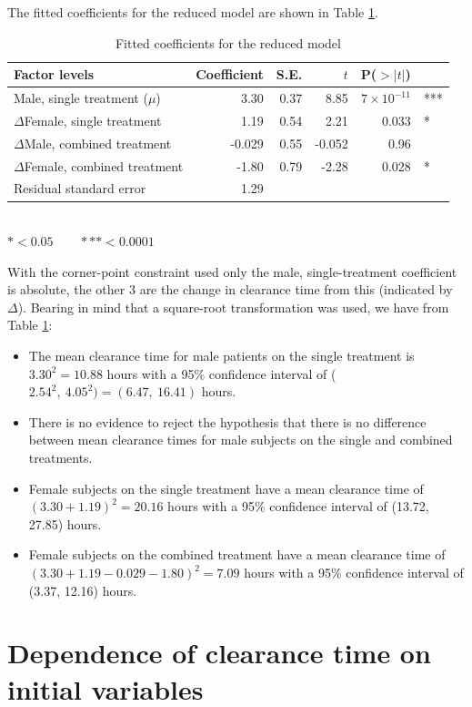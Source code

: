 The fitted coefficients for the reduced model are shown in Table \ref{coefreduced}.
\begin{table}[h]
\centering
\caption{Fitted coefficients for the reduced model}\label{coefreduced}
\begin{tabular}{l|rrrrl}
Factor levels&Coefficient&S.E.&$t$&P($>|t|$)\\
\hline
Male, single treatment ($\mu$)       &     3.30  &  0.37 &   8.85 &  $7\times 10^{-11}$& ***\\
$\Delta$Female, single treatment  &            1.19 &  0.54 &  2.21 &  0.033& *\\
$\Delta$Male, combined treatment    &    -0.029   & 0.55 & -0.052 &  0.96&\\
$\Delta$Female, combined treatment    &  -1.80   & 0.79  & -2.28  & 0.028& *\\
\hline
Residual standard error&1.29&&&
\end{tabular}\\
$*<0.05\quad\quad***<0.0001$
\end{table}
With the corner-point constraint used only the male, single-treatment coefficient is absolute, the other 3 are the change in clearance time from this (indicated by $\Delta$). Bearing in mind that a square-root transformation was used, we have from Table \ref{coefreduced}:
\begin{itemize}
\item The mean clearance time for male patients on the single treatment is $3.30^{2}=10.88$ hours with a 95\% confidence interval of ($2.54^{2},\ 4.05^{2})=(6.47,\ 16.41)$ hours.
\item There is no evidence to reject the hypothesis that there is no difference between mean clearance times for male subjects on the single and combined treatments.
\item Female subjects on the single treatment have a mean clearance time of $(3.30+1.19)^{2}=20.16$ hours with a 95\% confidence interval of (13.72, 27.85) hours.
\item Female subjects on the combined treatment have a mean clearance time of $(3.30+1.19-0.029-1.80)^{2}=7.09$ hours with a 95\% confidence interval of (3.37, 12.16) hours.
\end{itemize}
\clearpage
\section{Dependence of clearance time on initial variables}
